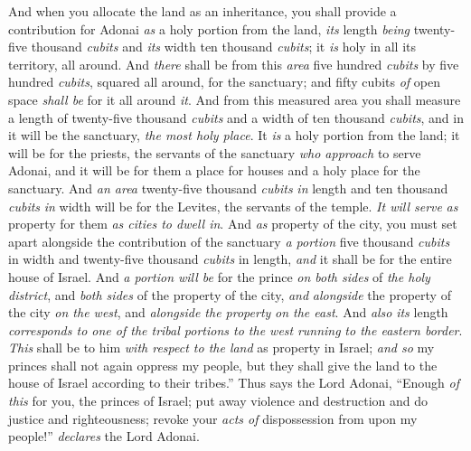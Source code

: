\begin{biblechapter} %
 And when you allocate the land as an inheritance, you shall provide a contribution for Adonai \textit{as} a holy portion from the land, \textit{its} length \textit{being} twenty-five thousand \textit{cubits} and \textit{its} width ten thousand \textit{cubits}; it \textit{is} holy in all its territory, all around.
\verse And \textit{there} shall be from this \textit{area} five hundred \textit{cubits} by five hundred \textit{cubits}, squared all around, for the sanctuary; and fifty cubits﻿ \textit{of} open space \textit{shall be} for it all around \textit{it}.
\verse And from this measured area you shall measure a length of twenty-five thousand \textit{cubits} and a width of ten thousand \textit{cubits}, and in it will be the sanctuary, \textit{the most holy place}.
\verse It \textit{is} a holy portion from the land; it will be for the priests, the servants of the sanctuary \textit{who approach} to serve Adonai, and it will be for them a place for houses and a holy place for the sanctuary.
\verse And \textit{an area} twenty-five thousand \textit{cubits} \textit{in} length and ten thousand \textit{cubits} \textit{in} width will be for the Levites, the servants of the temple. \textit{It will serve} \textit{as} property for them \textit{as cities to dwell in}.
\verse And \textit{as} property of the city, you must set apart alongside the contribution of the sanctuary \textit{a portion} five thousand \textit{cubits} in width and twenty-five thousand \textit{cubits} in length, \textit{and} it shall be for the entire house of Israel.
\verse And \textit{a portion will be} for the prince \textit{on both sides} of \textit{the holy district}, and \textit{both sides} of the property of the city, \textit{and} \textit{alongside} the property of the city \textit{on the west}, and \textit{alongside the property} \textit{on the east}. And \textit{also} \textit{its} length \textit{corresponds to one of the tribal portions to the west} \textit{running} \textit{to the eastern border}.
\verse \textit{This} shall be to him \textit{with respect to the land} as property in Israel; \textit{and so} my princes shall not again oppress my people, but they shall give the land to the house of Israel according to their tribes.”
\verse Thus says the Lord Adonai, “Enough \textit{of this} for you, the princes of Israel; put away violence and destruction and do justice and righteousness; revoke your \textit{acts of} dispossession from upon my people!” \textit{declares} the Lord Adonai.

\end{biblechapter}
